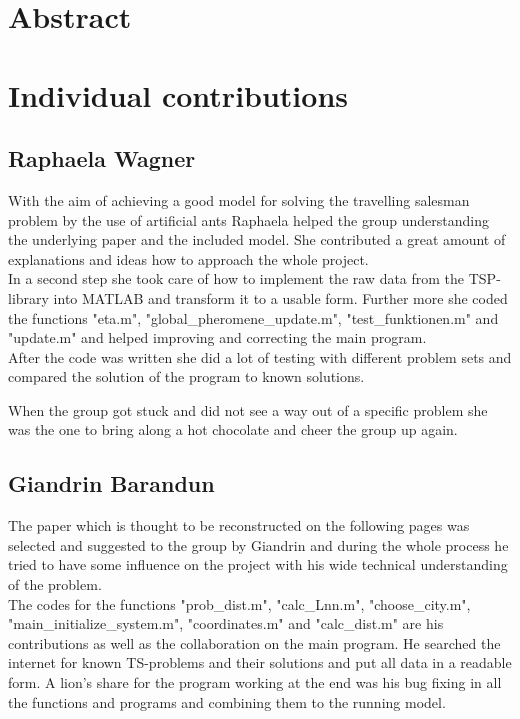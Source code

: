 \documentclass[11pt]{article}
\begin{document}
\newpage




\section{Abstract}

\section{Individual contributions}
\subsection{Raphaela Wagner}
With the aim of achieving a good model for solving the travelling salesman problem by the use of artificial ants Raphaela helped the group understanding the underlying paper and the included model. She contributed a great amount of explanations and ideas how to approach the whole project. \\
In a second step she took care of how to implement the raw data from the TSP-library into MATLAB and transform it to a usable form. Further more she coded the functions "eta.m", "global\_pheromene\_update.m", "test\_funktionen.m" and "update.m" and helped improving and correcting the main program. \\
After the code was written she did a lot of testing with different problem sets and compared the solution of the program to known solutions. 

When the group got stuck and did not see a way out of a specific problem she was the one to bring along a hot chocolate and cheer the group up again.

\subsection{Giandrin Barandun}
The paper which is thought to be reconstructed on the following pages was selected and suggested to the group by Giandrin and during the whole process he tried to have some influence on the project with his wide technical understanding of the problem. \\
The codes for the functions "prob\_dist.m", "calc\_Lnn.m", "choose\_city.m", "main\_initialize\_system.m", "coordinates.m" and "calc\_dist.m" are his contributions as well as the collaboration on the main program. He searched the internet for known TS-problems and their solutions and put all data in a readable form. A lion's share for the program working at the end was his bug fixing in all the functions and programs and combining them to the running model.
\end{document}
